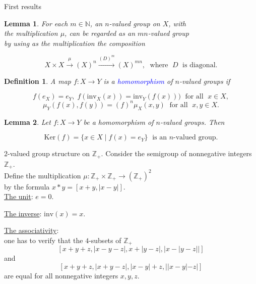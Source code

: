 \documentclass{beamer}
\newtheorem{lem}{Lemma}
\newtheorem{defn}{Definition}
\def\blue#1{\textcolor{blue}{#1}}
\begin{document}
\begin{frame}{First results}
\begin{lem}
For each $m\in\mathbb{N}$, an $n$-valued group on $X$, with\\ the multiplication $\mu$, can be regarded as an
$mn$-valued group\\ by using as the multiplication the composition
\vspace{-0.2cm}

\[
X\times X\overset{\mu}\longrightarrow(X)^n\overset{(D)^m}{\longrightarrow} (X)^{m n},\;\text{ where }\; D\;\text{ is diagonal}.
\]
\end{lem}
\begin{defn}
A map $f\colon X\to Y$ is a \blue{homomorphism} of $n$-valued groups if
 \vspace{-0.2cm}

\[
f(e_X)=e_Y,\; f(\mathrm{inv}_X(x))=\mathrm{inv}_Y(f(x)))\;\text{ for all }\; x\in X,
\]
\[
\mu_{Y}(f(x),f(y))=(f)^n\mu_X(x,y)\;\text{ for all }\; x,y\in X.
\]
\end{defn}
\begin{lem}
Let $f\colon X\to Y$ be a homomorphism of $n$-valued groups. Then
\vspace{-0.2cm}

\[
\mathrm{Ker}(f)=\{x\in X\mid f(x)=e_Y\}\;\text{ is an $n$-valued group}.
\]
\end{lem}
\end{frame}




\begin{frame}{$2$-valued group structure on $\mathbb{Z}_{+}$.}
Consider the semigroup  of nonnegative integers $\mathbb{Z}_+$.\\[3pt]
Define the multiplication \;$\mu\colon \mathbb{Z}_+\times \mathbb{Z}_+\to (\mathbb{Z}_+)^2$ \\[3pt]
by the formula\; $x*y=[x+y,|x-y|]$.\\[7pt]

\underline{The unit}: $e=0$.
\vspace{0.2cm}

\underline{The inverse}: $\mathrm{inv}(x)=x$.
\vspace{0.2cm}

\underline{The associativity}:\\[3pt]
one has to verify that the $4$-subsets of
$\mathbb{Z}_+$
\[[x+y+z, |x-y-z|,x+|y-z|, |x-|y-z||]\]
and
\[[x+y+z,|x+y-z|,|x-y|+z,||x-y|-z|]\]
are equal for all nonnegative integers $x,y,z$.
\end{frame}
\end{document}
